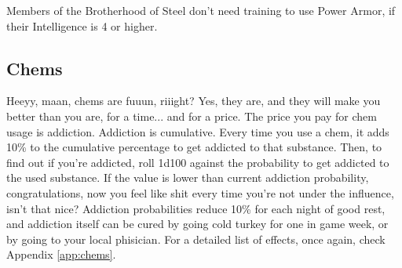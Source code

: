 \documentclass[11pt]{article} %
\begin{document}
Members of the Brotherhood of Steel don't need training to use Power Armor, if their Intelligence is 4 or higher.

\subsection{Chems}

Heeyy, maan, chems are fuuun, riiight? Yes, they are, and they will make you better than you are, for a time... and for a price. The price you pay for chem usage is addiction. Addiction is cumulative. Every time you use a chem, it adds 10\% to the cumulative percentage to get addicted to that substance. Then, to find out if you're addicted, roll 1d100 against the probability to get addicted to the used substance. If the value is lower than current addiction probability, congratulations, now you feel like shit every time you're not under the influence, isn't that nice? Addiction probabilities reduce 10\% for each night of good rest, and addiction itself can be cured by going cold turkey for one in game week, or by going to your local phisician. For a detailed list of effects, once again, check Appendix \ref{app:chems}. 
\end{document}
